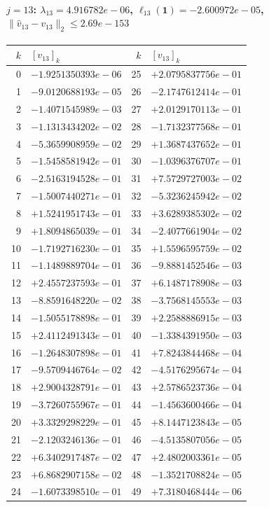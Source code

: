 \documentclass[11pt]{article}
\begin{document}
\paragraph{$j = 13$: $\lambda_{13} = 4.916782e-06$, \quad $\ell_{13}(\mathbf{1}) = -2.600972e-05$, \quad $\|\hat{v}_{13} - v_{13}\|_2 \leq 2.69e-153$}
\begin{center}
{\footnotesize
\begin{tabular}{r@{\;\;}l@{\quad}r@{\;\;}l}
\toprule
$k$ & $[v_{13}]_k$ & $k$ & $[v_{13}]_k$ \\
\midrule
0 & $-1.9251350393e-06$ & 25 & $+2.0795837756e-01$ \\
1 & $-9.0120688193e-05$ & 26 & $-2.1747612414e-01$ \\
2 & $-1.4071545989e-03$ & 27 & $+2.0129170113e-01$ \\
3 & $-1.1313434202e-02$ & 28 & $-1.7132377568e-01$ \\
4 & $-5.3659908959e-02$ & 29 & $+1.3687437652e-01$ \\
5 & $-1.5458581942e-01$ & 30 & $-1.0396376707e-01$ \\
6 & $-2.5163194528e-01$ & 31 & $+7.5729727003e-02$ \\
7 & $-1.5007440271e-01$ & 32 & $-5.3236245942e-02$ \\
8 & $+1.5241951743e-01$ & 33 & $+3.6289385302e-02$ \\
9 & $+1.8094865039e-01$ & 34 & $-2.4077661904e-02$ \\
10 & $-1.7192716230e-01$ & 35 & $+1.5596595759e-02$ \\
11 & $-1.1489889704e-01$ & 36 & $-9.8881452546e-03$ \\
12 & $+2.4557237593e-01$ & 37 & $+6.1487178908e-03$ \\
13 & $-8.8591648220e-02$ & 38 & $-3.7568145553e-03$ \\
14 & $-1.5055178898e-01$ & 39 & $+2.2588886915e-03$ \\
15 & $+2.4112491343e-01$ & 40 & $-1.3384391950e-03$ \\
16 & $-1.2648307898e-01$ & 41 & $+7.8243844468e-04$ \\
17 & $-9.5709446764e-02$ & 42 & $-4.5176295674e-04$ \\
18 & $+2.9004328791e-01$ & 43 & $+2.5786523736e-04$ \\
19 & $-3.7260755967e-01$ & 44 & $-1.4563600466e-04$ \\
20 & $+3.3329298229e-01$ & 45 & $+8.1447123843e-05$ \\
21 & $-2.1203246136e-01$ & 46 & $-4.5135807056e-05$ \\
22 & $+6.3402917487e-02$ & 47 & $+2.4802003361e-05$ \\
23 & $+6.8682907158e-02$ & 48 & $-1.3521708824e-05$ \\
24 & $-1.6073398510e-01$ & 49 & $+7.3180468444e-06$ \\
\bottomrule
\end{tabular}
}
\end{center}
\end{document}
